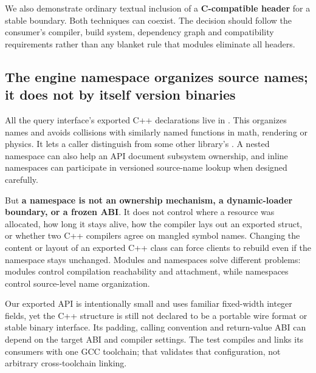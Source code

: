 We also demonstrate ordinary textual inclusion of a \textbf{C-compatible header} for a stable boundary. Both techniques can coexist. The decision should follow the consumer's compiler, build system, dependency graph and compatibility requirements rather than any blanket rule that modules eliminate all headers.

\subsection{The engine namespace organizes source names; it does not by itself version binaries}\label{01-foundations-i-ch006-the-engine-namespace-organizes-source-names-it-does-not-by-itself-version-binaries}

\hypertarget{01-foundations-i-ch006-the-engine-namespace-organizes-source-names-it-does-not-by-itself-version-binaries}{}

All the query interface's exported C++ declarations live in . This organizes names and avoids collisions with similarly named functions in math, rendering or physics. It lets a caller distinguish  from some other library's . A nested namespace can also help an API document subsystem ownership, and inline namespaces can participate in versioned source-name lookup when designed carefully.

But \textbf{a namespace is not an ownership mechanism, a dynamic-loader boundary, or a frozen ABI}. It does not control where a resource was allocated, how long it stays alive, how the compiler lays out an exported struct, or whether two C++ compilers agree on mangled symbol names. Changing the content or layout of an exported C++ class can force clients to rebuild even if the namespace stays unchanged. Modules and namespaces solve different problems: modules control compilation reachability and attachment, while namespaces control source-level name organization.

Our exported API is intentionally small and uses familiar fixed-width integer fields, yet the C++  structure is still not declared to be a portable wire format or stable binary interface. Its padding, calling convention and return-value ABI can depend on the target ABI and compiler settings. The test compiles and links its consumers with one GCC toolchain; that validates that configuration, not arbitrary cross-toolchain linking.

